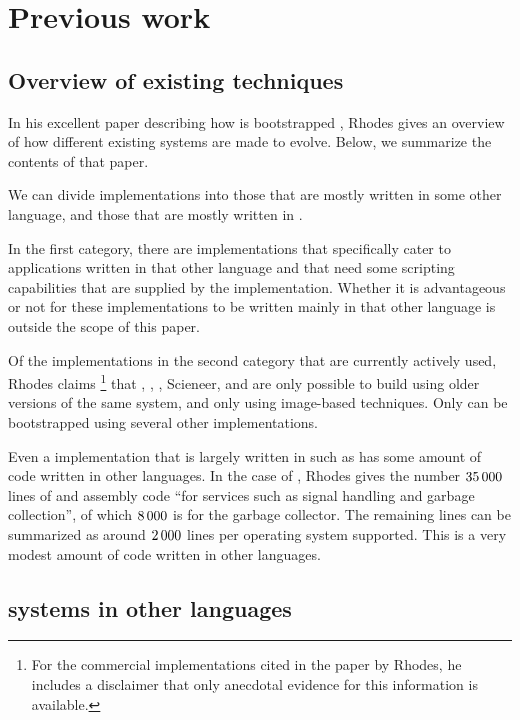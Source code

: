 \section{Previous work}

\subsection{Overview of existing techniques}

In his excellent paper describing how \sbcl{} is bootstrapped
\cite{Rhodes:2008:SSC:1482373.1482380}, Rhodes gives an overview of
how different existing \commonlisp{} systems are made to evolve.
Below, we summarize the contents of that paper.

We can divide \commonlisp{} implementations into those that are mostly
written in some other language, and those that are mostly written in
\commonlisp{}.

In the first category, there are implementations that specifically
cater to applications written in that other language and that need
some scripting capabilities that are supplied by the \commonlisp{}
implementation.  Whether it is advantageous or not for these
implementations to be written mainly in that other language is outside
the scope of this paper.

Of the implementations in the second category that are currently
actively used, Rhodes claims%
\footnote{For the commercial \commonlisp{} implementations cited in
  the paper by Rhodes, he includes a disclaimer that only anecdotal
  evidence for this information is available.}
that \allegro{}, \lispworks{}, \cmucl{}, Scieneer, and \ccl{} are only
possible to build using older versions of the same system, and only
using image-based techniques.  Only \sbcl{} can be bootstrapped using
several other \commonlisp{} implementations.

Even a \commonlisp{} implementation that is largely written in
\commonlisp{} such as \sbcl{} has some amount of code written in other
languages.  In the case of \sbcl{}, Rhodes gives the number
$35\thinspace000$ lines of \clanguage{} and assembly code ``for
services such as signal handling and garbage collection'', of which
$8\thinspace000$ is for the garbage collector.  The remaining lines
can be summarized as around $2\thinspace000$ lines per operating
system supported.  This is a very modest amount of code written in
other languages.

\subsection{\commonlisp{} systems in other languages}

